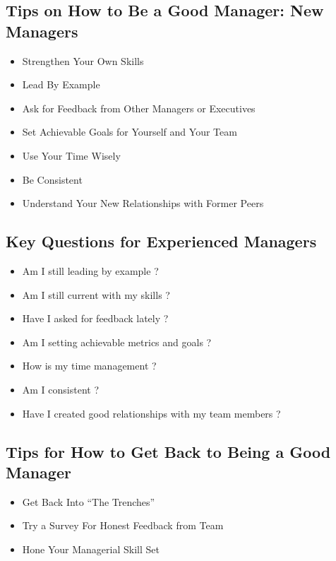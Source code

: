 \documentclass[a4paper,12pt]{report} %
\begin{document}
\subsection{Tips on How to Be a Good Manager: New Managers}
\begin{itemize}
\item Strengthen Your Own Skills
\item Lead By Example
\item Ask for Feedback from Other Managers or Executives
\item Set Achievable Goals for Yourself and Your Team
\item Use Your Time Wisely
\item Be Consistent
\item Understand Your New Relationships with Former Peers
\end{itemize}
\subsection{Key Questions for Experienced Managers}
\begin{itemize}
\item Am I still leading by example ?
\item Am I still current with my skills ?
\item Have I asked for feedback lately ?
\item Am I setting achievable metrics and goals ?
\item How is my time management ?
\item Am I consistent ?
\item Have I created good relationships with my team members ?
\end{itemize}
\subsection{Tips for How to Get Back to Being a Good Manager}
\begin{itemize}
\item Get Back Into “The Trenches”
\item Try a Survey For Honest Feedback from Team
\item Hone Your Managerial Skill Set
\end{itemize}
\end{document}
